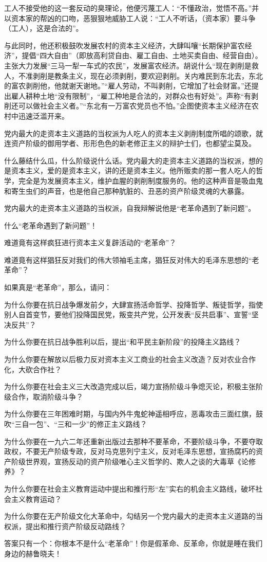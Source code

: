 \begin{maonote}
工人不接受他的这一套反动的臭理论，他便污蔑工人：“不懂政治，觉悟不高。”并以资本家的帮凶的口吻，恶狠狠地威胁工人说：“工人不听话，（资本家）要斗争（工人），这是合法的”。

与此同时，他还积极鼓吹发展农村的资本主义经济，大肆叫嚷“长期保护富农经济”，提倡“四大自由”（即放高利贷自由、雇工自由、土地买卖自由、经营自由）。主张大力发展“三马一犁一车式的农民”，发展富农经济。胡说什么“现在剥削是救人，不准剥削是教条主义，现在必须剥削，要欢迎剥削。关内难民到东北去，东北的富农剥削他，他就谢天谢地。”“雇人劳动，不叫剥削，它增加了社会财富。”还提出雇人耕种土地“没有限制”，“雇工种地是合法的，对群众也有好处”。声称“有剥削还可以做社会主义者。”“东北有一万富农党员也不怕。”企图使资本主义经济在农村中迅速泛滥开来。

党内最大的走资本主义道路的当权派为人吃人的资本主义剥削制度所唱的颂歌，就连资产阶级的御用学者、形形色色的新老修正主义的辩护士们，也都望尘莫及。

什么藤结什么瓜，什么阶级说什么话。党内最大的走资本主义道路的当权派，想的是资本主义，爱的是资本主义，讲的还是资本主义。他所贩卖的那一套人吃人的哲学，完全是为发展资本主义，维护血腥的剥削制度服务的。他的这种声音是吸血鬼和寄生虫们的声音，也是他自己那种肮脏的、丑恶的资产阶级灵魂的大暴露。

党内最大的走资本主义道路的当权派，自我辩解说他是“老革命遇到了新问题”。

什么“老革命遇到了新问题”！

难道竟有这样疯狂进行资本主义复辟活动的“老革命”？

难道竟有这样猖狂反对我们的伟大领袖毛主席，猖狂反对伟大的毛泽东思想的“老革命”？

如果真是“老革命”，那么，请问：

为什么你要在抗日战争爆发前夕，大肆宣扬活命哲学、投降哲学、叛徒哲学，指使别人自首变节，要他们投降国民党，叛变共产党，公开发表“反共启事”、宣誓“坚决反共”？

为什么你要在抗日战争胜利以后，提出“和平民主新阶段”的投降主义路线？

为什么你要在解放以后极力反对资本主义工商业的社会主义改造？反对农业合作化，大砍合作社？

为什么你要在社会主义三大改造完成以后，竭力宣扬阶级斗争熄灭论，积极主张阶级合作，取消阶级斗争？

为什么你要在三年困难时期，与国内外牛鬼蛇神遥相呼应，恶毒攻击三面红旗，鼓吹“三自一包”、“三和一少”的修正主义路线？

为什么你要在一九六二年还重新出版过去那种不要革命，不要阶级斗争，不要夺取政权，不要无产阶级专政，反对马克思列宁主义，反对毛泽东思想，宣扬腐朽的资产阶级世界观，宣扬反动的资产阶级唯心主义哲学的、欺人之谈的大毒草《论修养》？

为什么你要在社会主义教育运动中提出和推行形“左”实右的机会主义路线，破坏社会主义教育运动？

为什么你要在无产阶级文化大革命中，勾结另一个党内最大的走资本主义道路的当权派，提出和推行资产阶级反动路线？

答案只有一个：你根本不是什么“老革命”！你是假革命、反革命，你就是睡在我们身边的赫鲁晓夫！
\end{maonote}
